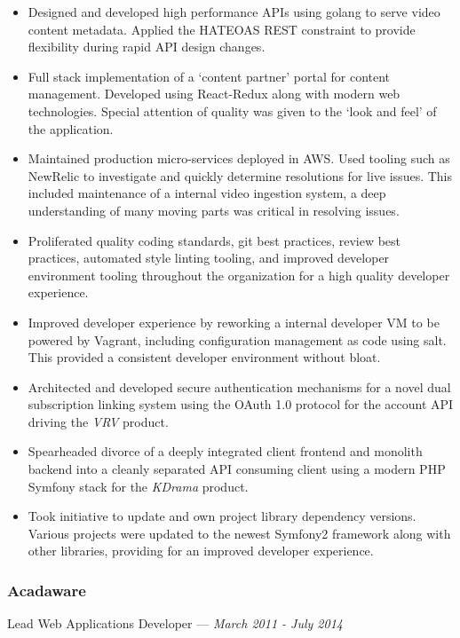 \documentclass[letterpaper,10pt]{article}
\begin{document}
\begin{itemize}
\tightlist{}
\item
  Designed and developed high performance APIs using golang to serve
  video content metadata. Applied the HATEOAS REST constraint to provide
  flexibility during rapid API design changes.
\item
  Full stack implementation of a `content partner' portal for content
  management. Developed using React-Redux along with modern web technologies.
  Special attention of quality was given to the `look and feel' of the
  application.
\item
  Maintained production micro-services deployed in AWS\@. Used tooling such as
  NewRelic to investigate and quickly determine resolutions for live issues.
  This included maintenance of a internal video ingestion system, a deep
  understanding of many moving parts was critical in resolving issues.
\item
  Proliferated quality coding standards, git best practices, review best
  practices, automated style linting tooling, and improved developer
  environment tooling throughout the organization for a high quality
  developer experience.
\item
  Improved developer experience by reworking a internal developer VM to be
  powered by Vagrant, including configuration management as code using salt.
  This provided a consistent developer environment without bloat.
\item
  Architected and developed secure authentication mechanisms for a novel
  dual subscription linking system using the OAuth 1.0 protocol for the
  account API driving the \emph{VRV} product.
\item
  Spearheaded divorce of a deeply integrated client frontend and monolith
  backend into a cleanly separated API consuming client using a modern PHP
  Symfony stack for the \emph{KDrama} product.
\item
  Took initiative to update and own project library dependency versions.
  Various projects were updated to the newest Symfony2 framework along with
  other libraries, providing for an improved developer experience.
\end{itemize}

\subsubsection{Acadaware}
\hfill Lead Web Applications Developer --- \emph{March 2011 - July 2014}
\end{document}
